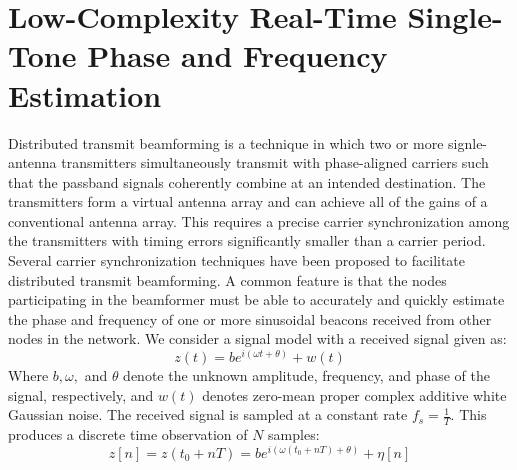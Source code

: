 \documentclass{article}
\theoremstyle{mystyle}
\begin{document}
\section{Low-Complexity Real-Time Single-Tone Phase and Frequency Estimation}
Distributed transmit beamforming is a technique in which two or more signle-antenna transmitters simultaneously transmit with phase-aligned carriers such that the passband signals coherently combine at an intended destination. The transmitters form a virtual antenna array and can achieve all of the gains of a conventional antenna array. This requires a precise carrier synchronization among the transmitters with timing errors significantly smaller than a carrier period. Several carrier synchronization techniques have been proposed to facilitate distributed transmit beamforming. A common feature is that the nodes participating in the beamformer must be able to accurately and quickly estimate the phase and frequency of one or more sinusoidal beacons received from other nodes in the network. We consider a signal model with a received signal given as:
\begin{equation}
z(t) = be^{i(\omega t+\theta)}+w(t)
\end{equation}
Where $b,\omega,$ and $\theta$ denote the unknown amplitude, frequency, and phase of the signal, respectively, and $w(t)$ denotes zero-mean proper complex additive white Gaussian noise. The received signal is sampled at a constant rate $f_{s} = \frac{1}{T}$. This produces a discrete time observation of $N$ samples:
\begin{equation}
z[n] = z(t_{0}+nT) = be^{i(\omega(t_{0}+nT)+\theta)}+\eta[n]
\end{equation}
\end{document}
